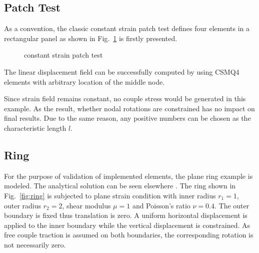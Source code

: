 \documentclass[3p,sort&compress,11pt,fleqn]{elsarticle}
\newcommand*{\figref}[1]{Fig.~\ref{#1}}
\begin{document}
\subsection{Patch Test}
As a convention, the classic constant strain patch test defines four elements in a rectangular panel as shown in \figref{fig:csmq_patch} is firstly presented.
\begin{figure}[htb]
\centering\scriptsize
{}
\caption{constant strain patch test}\label{fig:csmq_patch}
\end{figure}
The linear displacement field can be successfully computed by using CSMQ4 elements with arbitrary location of the middle node.

Since strain field remains constant, no couple stress would be generated in this example. As the result, whether nodal rotations are constrained has no impact on final results. Due to the same reason, any positive numbers can be chosen as the characteristic length $l$.
\subsection{Ring}
For the purpose of validation of implemented elements, the plane ring example is modeled. The analytical solution can be seen elsewhere \citep{Hadjesfandiari2011}. The ring shown in \figref{fig:ring} is subjected to plane strain condition with inner radius $r_1=1$, outer radius $r_2=2$, shear modulus $\mu=1$ and Poisson's ratio $\nu=0.4$. The outer boundary is fixed thus translation is zero. A uniform horizontal displacement is applied to the inner boundary while the vertical displacement is constrained. As free couple traction is assumed on both boundaries, the corresponding rotation is not necessarily zero.
\end{document}
